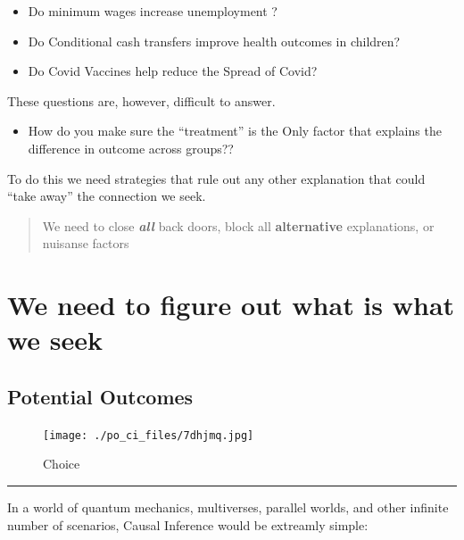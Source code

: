 \documentclass[
  letterpaper,
  DIV=11,
  numbers=noendperiod]{scrartcl}
\providecommand{\tightlist}{%
  \setlength{\itemsep}{0pt}\setlength{\parskip}{0pt}}\usepackage{longtable,booktabs,array}
\begin{document}
\begin{itemize}
\tightlist
\item
  Do minimum wages increase unemployment ?
\item
  Do Conditional cash transfers improve health outcomes in children?
\item
  Do Covid Vaccines help reduce the Spread of Covid?
\end{itemize}

These questions are, however, difficult to answer.

\begin{itemize}
\tightlist
\item
  How do you make sure the ``treatment'' is the Only factor that
  explains the difference in outcome across groups??
\end{itemize}

To do this we need strategies that rule out any other explanation that
could ``take away'' the connection we seek.

\begin{quote}
We need to close \textbf{\emph{all}} back doors, block all
\textbf{alternative} explanations, or nuisanse factors
\end{quote}

\hypertarget{we-need-to-figure-out-what-is-what-we-seek}{%
\section{We need to figure out what is what we
seek}\label{we-need-to-figure-out-what-is-what-we-seek}}

\hypertarget{potential-outcomes}{%
\subsection{Potential Outcomes}\label{potential-outcomes}}

\begin{figure}

{\centering \texttt{[image: ./po\_ci\_files/7dhjmq.jpg]}

}

\caption{Choice}

\end{figure}

\begin{center}\rule{0.5\linewidth}{0.5pt}\end{center}

In a world of quantum mechanics, multiverses, parallel worlds, and other
infinite number of scenarios, Causal Inference would be extreamly
simple:
\end{document}
